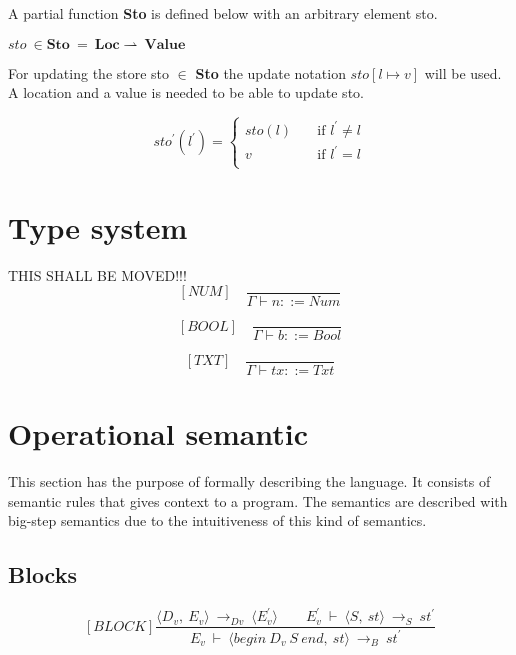   A partial function \textbf{Sto} is defined below with an arbitrary element sto.
  
  \begin{math}
	  sto \ \in \boldsymbol{Sto} \ = \ \boldsymbol{Loc} \rightharpoonup \ \boldsymbol{Value}
  \end{math}
  
  For updating the store sto \begin{math} \in \end{math} \textbf{Sto} the update notation \begin{math} sto[l \mapsto v] \end{math} will be used. A location and a value is needed to be able to update sto.
  
  \[ sto^{'}(l^{'}) =
    \begin{cases}
      sto(l)       & \quad \text{if } l^{'} \not= l\\
      v  & \quad \text{if } l^{'} = l\\
    \end{cases}
  \]
  
  
  
  
  \section{Type system}
  THIS SHALL BE MOVED!!!
	\[
	[NUM] \quad
	\dfrac{}{\Gamma \vdash n ::= Num}
	\]
	 
	\[
	[BOOL] \quad
	\dfrac{}{\Gamma \vdash b ::= Bool}
	\]
	
  	\[
  	[TXT] \quad
  	\dfrac{}{\Gamma \vdash tx ::= Txt}
  	\]
  	
  \section{Operational semantic}
  This section has the purpose of formally describing the language. It consists of semantic rules that gives context to a program. 
  The semantics are described with big-step semantics due to the intuitiveness of this kind of semantics. 
  
  \subsection{Blocks}
    \[
	  [BLOCK]
	  \dfrac{\langle D_v, \ E_v \rangle \ \rightarrow_{Dv} \ \langle E_v^{'} \rangle \qquad E_v^{'} \ \vdash \ \langle S, \ st \rangle \ \rightarrow_S \ st^{'}}{E_v \ \vdash \ \langle begin \ D_v \ S \ end, \ st \rangle \ \rightarrow_B \ st^{'}}
	  \]
  
